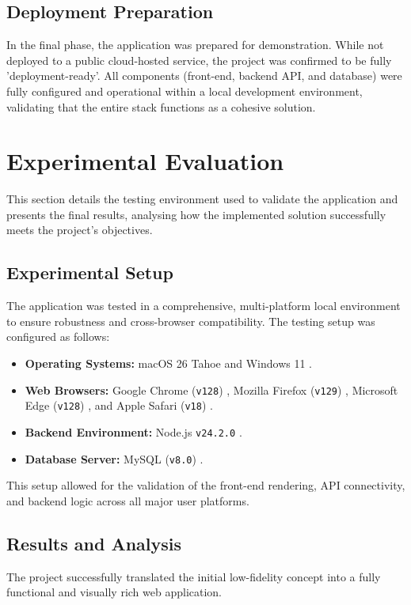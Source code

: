 \documentclass[12pt,a4paper]{article}
\begin{document}
    \subsection{Deployment Preparation}
    In the final phase, the application was prepared for demonstration. While not deployed to a public cloud-hosted service, the project was confirmed to be fully 'deployment-ready'. All components (front-end, backend API, and database) were fully configured and operational within a local development environment, validating that the entire stack functions as a cohesive solution.
    \clearpage
    \section{Experimental Evaluation}
    This section details the testing environment used to validate the application and presents the final results, analysing how the implemented solution successfully meets the project's objectives.
    \subsection{Experimental Setup}
    The application was tested in a comprehensive, multi-platform local environment to ensure robustness and cross-browser compatibility. The testing setup was configured as follows:
    \begin{itemize}[label=$\bullet$, leftmargin=*]
        \item \textbf{Operating Systems:} macOS 26 Tahoe \cite{macOS_Tahoe} and Windows 11 \cite{Windows_11}.
        \item \textbf{Web Browsers:} Google Chrome (\texttt{v128}) \cite{Google_Chrome}, Mozilla Firefox (\texttt{v129}) \cite{Firefox}, Microsoft Edge (\texttt{v128}) \cite{Microsoft_Edge}, and Apple Safari (\texttt{v18}) \cite{Apple_Safari}.
        \item \textbf{Backend Environment:} Node.js \texttt{v24.2.0} \cite{Nodejs}.
        \item \textbf{Database Server:} MySQL (\texttt{v8.0}) \cite{Mysql}.
    \end{itemize}
    This setup allowed for the validation of the front-end rendering, API connectivity, and backend logic across all major user platforms.
    \subsection{Results and Analysis}
    The project successfully translated the initial low-fidelity concept into a fully functional and visually rich web application.
\end{document}
